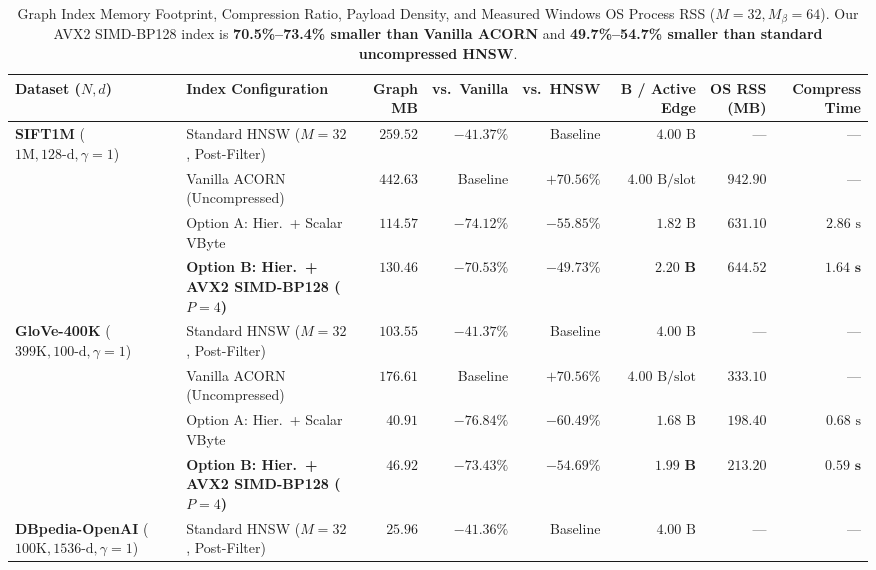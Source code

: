 \begin{table}[t]
\centering
\caption{Graph Index Memory Footprint, Compression Ratio, Payload Density, and Measured Windows OS Process RSS ($M=32, M_\beta=64$). Our AVX2 SIMD-BP128 index is \textbf{70.5\%--73.4\% smaller than Vanilla ACORN} and \textbf{49.7\%--54.7\% smaller than standard uncompressed HNSW}.}
\label{tab:memory}
\small
\begin{tabular}{@{}llrrrrrr@{}}
\toprule
\textbf{Dataset ($N, d$)} & \textbf{Index Configuration} & \textbf{Graph MB} & \textbf{vs.\ Vanilla} & \textbf{vs.\ HNSW} & \textbf{B / Active Edge} & \textbf{OS RSS (MB)} & \textbf{Compress Time} \\
\midrule
\multirow{4}{*}{\textbf{SIFT1M} ($1\text{M}, 128\text{-d}, \gamma=1$)}
 & Standard HNSW ($M=32$, Post-Filter) & $259.52$ & $-41.37\%$ & Baseline & $4.00\text{ B}$ & --- & --- \\
 & Vanilla ACORN (Uncompressed) & $442.63$ & Baseline & $+70.56\%$ & $4.00\text{ B/slot}$ & $942.90$ & --- \\
 & Option A: Hier.\ + Scalar VByte & $114.57$ & $-74.12\%$ & $-55.85\%$ & $1.82\text{ B}$ & $631.10$ & $2.86\text{ s}$ \\
 & \textbf{Option B: Hier.\ + AVX2 SIMD-BP128 ($P=4$)} & $\mathbf{130.46}$ & $\mathbf{-70.53\%}$ & $\mathbf{-49.73\%}$ & $\mathbf{2.20\text{ B}}$ & $\mathbf{644.52}$ & $\mathbf{1.64\text{ s}}$ \\
\midrule
\multirow{4}{*}{\textbf{GloVe-400K} ($399\text{K}, 100\text{-d}, \gamma=1$)}
 & Standard HNSW ($M=32$, Post-Filter) & $103.55$ & $-41.37\%$ & Baseline & $4.00\text{ B}$ & --- & --- \\
 & Vanilla ACORN (Uncompressed) & $176.61$ & Baseline & $+70.56\%$ & $4.00\text{ B/slot}$ & $333.10$ & --- \\
 & Option A: Hier.\ + Scalar VByte & $40.91$ & $-76.84\%$ & $-60.49\%$ & $1.68\text{ B}$ & $198.40$ & $0.68\text{ s}$ \\
 & \textbf{Option B: Hier.\ + AVX2 SIMD-BP128 ($P=4$)} & $\mathbf{46.92}$ & $\mathbf{-73.43\%}$ & $\mathbf{-54.69\%}$ & $\mathbf{1.99\text{ B}}$ & $\mathbf{213.20}$ & $\mathbf{0.59\text{ s}}$ \\
\midrule
\multirow{4}{*}{\textbf{DBpedia-OpenAI} ($100\text{K}, 1536\text{-d}, \gamma=1$)}
 & Standard HNSW ($M=32$, Post-Filter) & $25.96$ & $-41.36\%$ & Baseline & $4.00\text{ B}$ & --- & --- \\

\end{tabular}
\end{table}
